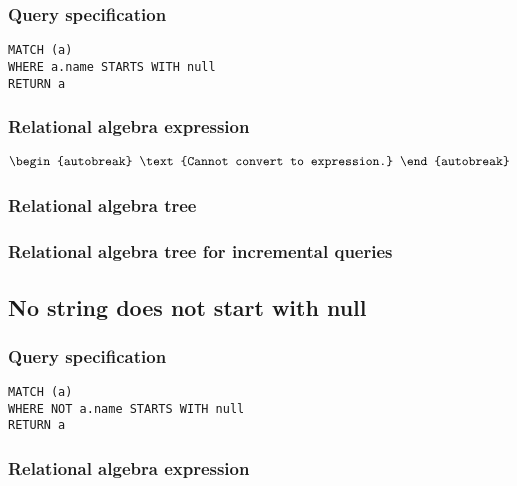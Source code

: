 \subsubsection*{Query specification}

\begin{lstlisting}
MATCH (a)
WHERE a.name STARTS WITH null
RETURN a
\end{lstlisting}

\subsubsection*{Relational algebra expression}

\begin{align*}
\begin{autobreak}
\text{Cannot convert to expression.}
\end{autobreak}
\end{align*}

\subsubsection*{Relational algebra tree}


\subsubsection*{Relational algebra tree for incremental queries}


\subsection{No string does not start with null}

\subsubsection*{Query specification}

\begin{lstlisting}
MATCH (a)
WHERE NOT a.name STARTS WITH null
RETURN a
\end{lstlisting}

\subsubsection*{Relational algebra expression}


